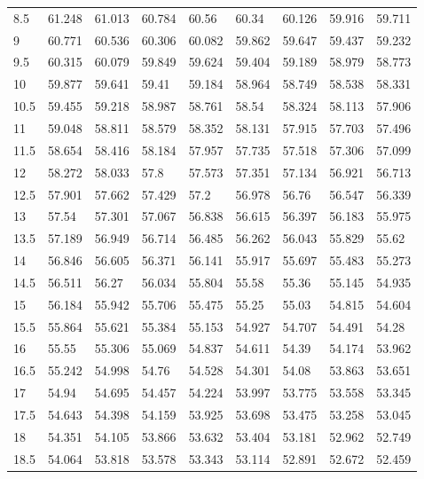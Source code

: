 \begin{bibunit}
\begin{table}[]
\begin{tabular}{lllllllll}
					8.5  & 61.248 & 61.013 & 60.784 & 60.56  & 60.34  & 60.126 & 59.916 & 59.711 \\
					9    & 60.771 & 60.536 & 60.306 & 60.082 & 59.862 & 59.647 & 59.437 & 59.232 \\
					9.5  & 60.315 & 60.079 & 59.849 & 59.624 & 59.404 & 59.189 & 58.979 & 58.773 \\
					10   & 59.877 & 59.641 & 59.41  & 59.184 & 58.964 & 58.749 & 58.538 & 58.331 \\
					10.5 & 59.455 & 59.218 & 58.987 & 58.761 & 58.54  & 58.324 & 58.113 & 57.906 \\
					11   & 59.048 & 58.811 & 58.579 & 58.352 & 58.131 & 57.915 & 57.703 & 57.496 \\
					11.5 & 58.654 & 58.416 & 58.184 & 57.957 & 57.735 & 57.518 & 57.306 & 57.099 \\
					12   & 58.272 & 58.033 & 57.8   & 57.573 & 57.351 & 57.134 & 56.921 & 56.713 \\
					12.5 & 57.901 & 57.662 & 57.429 & 57.2   & 56.978 & 56.76  & 56.547 & 56.339 \\
					13   & 57.54  & 57.301 & 57.067 & 56.838 & 56.615 & 56.397 & 56.183 & 55.975 \\
					13.5 & 57.189 & 56.949 & 56.714 & 56.485 & 56.262 & 56.043 & 55.829 & 55.62  \\
					14   & 56.846 & 56.605 & 56.371 & 56.141 & 55.917 & 55.697 & 55.483 & 55.273 \\
					14.5 & 56.511 & 56.27  & 56.034 & 55.804 & 55.58  & 55.36  & 55.145 & 54.935 \\
					15   & 56.184 & 55.942 & 55.706 & 55.475 & 55.25  & 55.03  & 54.815 & 54.604 \\
					15.5 & 55.864 & 55.621 & 55.384 & 55.153 & 54.927 & 54.707 & 54.491 & 54.28  \\
					16   & 55.55  & 55.306 & 55.069 & 54.837 & 54.611 & 54.39  & 54.174 & 53.962 \\
					16.5 & 55.242 & 54.998 & 54.76  & 54.528 & 54.301 & 54.08  & 53.863 & 53.651 \\
					17   & 54.94  & 54.695 & 54.457 & 54.224 & 53.997 & 53.775 & 53.558 & 53.345 \\
					17.5 & 54.643 & 54.398 & 54.159 & 53.925 & 53.698 & 53.475 & 53.258 & 53.045 \\
					18   & 54.351 & 54.105 & 53.866 & 53.632 & 53.404 & 53.181 & 52.962 & 52.749 \\
					18.5 & 54.064 & 53.818 & 53.578 & 53.343 & 53.114 & 52.891 & 52.672 & 52.459 \\

\end{tabular}
\end{table}
\end{bibunit}
